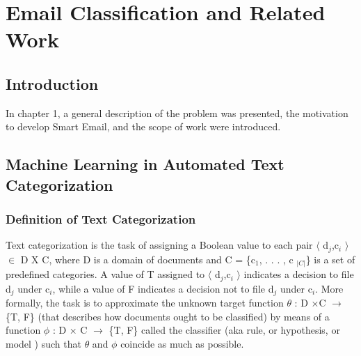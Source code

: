 \newenvironment{my_itemize}
{\begin{itemize}
  \setlength{\itemsep}{0cm}
  \setlength{\parskip}{0cm}}
{\end{itemize}}
\newenvironment{my_enumerate}
{\begin{enumerate}
  \setlength{\itemsep}{0cm}
  \setlength{\parskip}{0cm}}
{\end{enumerate}}

\chapter{Email Classification and Related Work} %

\label{Chapter2} %



\section{Introduction}
In chapter 1, a general description of the problem was presented, the motivation to develop Smart Email, and the scope of work were introduced.

\newpage

\section{Machine Learning in Automated Text Categorization}
\subsection{Definition of Text Categorization}
Text categorization is the task of assigning a Boolean value to each pair $\langle$ d$_{j}$,c$_{i}$ $\rangle$ $\in$ D X C,  where D is a domain of documents and C = \{c$_{1}$, . . . , c $_{|C|}$\} is a set of predefined categories. A value of T assigned to $\langle$ d$_{j}$,c$_{i}$ $\rangle$ indicates a decision to file d$_{j}$ under c$_{i}$, while a value of F indicates a decision not to file d$_{j}$ under c$_{i}$. More formally, the task is to approximate the unknown target function $\theta$ : D ×C $\rightarrow$ \{T, F\} (that describes how documents ought to be classified) by means of a function $\phi$ : D × C $\rightarrow$ \{T, F\} called the classifier (aka rule, or hypothesis, or model ) such that $\theta$ and $\phi$ coincide as much as possible.\cite{Sebastiani2002}

